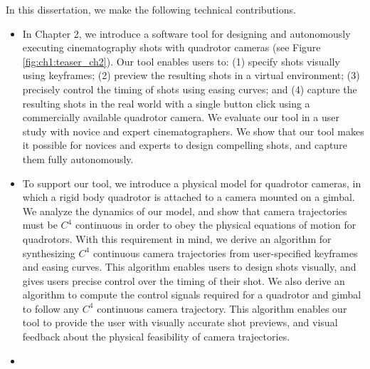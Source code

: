 In this dissertation, we make the following technical contributions.

\begin{itemize}

\item

In Chapter 2, we introduce a software tool for designing and autonomously executing cinematography shots with quadrotor cameras (see Figure \ref{fig:ch1:teaser_ch2}).
Our tool enables users to: (1) specify shots visually using keyframes; (2) preview the resulting shots in a virtual environment; (3) precisely control the timing of shots using easing curves; and (4) capture the resulting shots in the real world with a single button click using a commercially available quadrotor camera.
We evaluate our tool in a user study with novice and expert cinematographers.
We show that our tool makes it possible for novices and experts to design compelling shots, and capture them fully autonomously.

\item 

To support our tool, we introduce a physical model for quadrotor cameras, in which a rigid body quadrotor is attached to a camera mounted on a gimbal.
We analyze the dynamics of our model, and show that camera trajectories must be $C^4$ continuous in order to obey the physical equations of motion for quadrotors.
With this requirement in mind, we derive an algorithm for synthesizing $C^4$ continuous camera trajectories from user-specified keyframes and easing curves.
This algorithm enables users to design shots visually, and gives users precise control over the timing of their shot.
We also derive an algorithm to compute the control signals required for a quadrotor and gimbal to follow any $C^4$ continuous camera trajectory.
This algorithm enables our tool to provide the user with visually accurate shot previews, and visual feedback about the physical feasibility of camera trajectories.

\item


\end{itemize}
